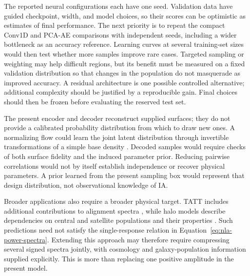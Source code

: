 The reported neural configurations each have one seed. Validation data
have guided checkpoint, width, and model choices, so their scores can be
optimistic as estimates of final performance. The next priority is to
repeat the compact Conv1D and PCA-AE comparisons with independent seeds,
including a wider bottleneck as an accuracy reference. Learning curves at
several training-set sizes would then test whether more samples improve
rare cases. Targeted sampling or weighting may help difficult regions,
but its benefit must be measured on a fixed validation distribution so
that changes in the population do not masquerade as improved accuracy.
A residual architecture \citep{He2016} is one possible controlled
alternative; additional complexity should be justified by a reproducible
gain. Final choices should then be frozen before evaluating the reserved
test set.

The present encoder and decoder reconstruct supplied surfaces; they do
not provide a calibrated probability distribution from which to draw
new ones. A normalizing flow could learn the joint latent distribution
through invertible transformations of a simple base density
\citep{Papamakarios2021}. Decoded samples would require checks of both
surface fidelity and the induced parameter prior. Reducing pairwise
correlations would not by itself establish independence or recover
physical parameters. A prior learned from the present sampling box would
represent that design distribution, not observational knowledge of IA.

Broader applications also require a broader physical target. TATT includes
additional contributions to alignment spectra
\citep{2019PhRvD.100j3506B}, while halo models describe dependencies on
central and satellite populations and their properties
\citep{Fortuna2021}. Such predictions need not satisfy the single-response
relation in Equation~\eqref{eq:nla-power-spectra}. Extending this approach
may therefore require compressing several signed spectra jointly, with
cosmology and galaxy-population information supplied explicitly. This is
more than replacing one positive amplitude in the present model.
